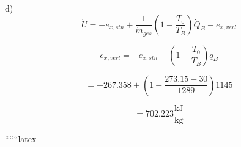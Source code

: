 d) \[ \dot{U} = -e_{x,stn} + \frac{1}{\dot{m}_{ges}} \left( 1 - \frac{T_0}{T_B} \right) \dot{Q}_B - e_{x,verl} \]

\[ e_{x,verl} = -e_{x,stn} + \left( 1 - \frac{T_0}{T_B} \right) q_B \]

\[ = -267.358 + \left( 1 - \frac{273.15 - 30}{1289} \right) 1145 \]

\[ = 702.223 \frac{\text{kJ}}{\text{kg}} \]

``````latex
